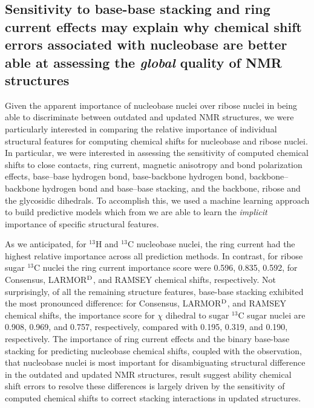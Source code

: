 \documentclass[fleqn,10pt]{wlscirep}
\begin{document}
\subsection*{Sensitivity to base-base stacking and ring current effects may explain why chemical shift errors associated with nucleobase are better able at assessing the \textit{global} quality of NMR structures} 
Given the apparent importance of nucleobase nuclei over ribose nuclei in being able to discriminate between outdated and updated NMR structures, we were particularly interested in comparing the relative importance of individual structural features for computing chemical shifts for nucleobase and ribose nuclei. In particular, we were interested in assessing the sensitivity of computed chemical shifts to close contacts, ring current, magnetic anisotropy and bond polarization effects, base--base  hydrogen bond, base-backbone  hydrogen bond, backbone--backbone hydrogen bond and base--base stacking, and the backbone, ribose and the glycosidic dihedrals. To accomplish this, we used a machine learning approach to build predictive models which from we are able to learn the \textit{implicit} importance of specific structural features.  

As we anticipated, for $^{13}$H and $^{13}$C nucleobase nuclei, the ring current had the highest relative importance across all prediction methods. In contrast,  for ribose sugar $^{13}$C nuclei  the ring current importance score were 0.596, 0.835, 0.592, for  Consensus, LARMOR$^{\rm D}$, and RAMSEY chemical shifts, respectively. Not surprisingly, of all the remaining structure features, base-base stacking exhibited the most pronounced difference: for Consensus, LARMOR$^{\rm D}$, and RAMSEY chemical shifts, the importance score for $ \chi$ dihedral to sugar $^{13}$C sugar nuclei are 0.908, 0.969, and 0.757, respectively, compared with 0.195, 0.319, and 0.190, respectively. The importance of ring current effects and the binary base-base stacking for predicting nucleobase chemical shifts, coupled with the observation, that nucleobase nuclei is most important for disambiguating structural difference in the outdated and updated NMR structures,  result suggest ability chemical shift errors to resolve these differences is largely driven by the sensitivity of computed chemical shifts to correct stacking interactions in updated structures. 
\end{document}

